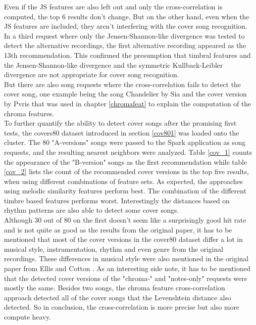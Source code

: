 \noindent Even if the JS features are also left out and only the cross-correlation is computed, the top 6 results don't change. But on the other hand, even when the JS features are included, they aren't interfering with the cover song recognition. In a third request where only the Jensen-Shannon-like divergence was tested to detect the alternative recordings, the first alternative recording appeared as the 13th recommendation. This confirmed the presumption that timbral features and the Jensen-Shannon-like divergence and the symmetric Kullback-Leibler divergence are not appropriate for cover song recognition.\\
\noindent But there are also song requests where the cross-correlation fails to detect the cover song, one example being the song Chandelier by Sia and the cover version by Pvris that was used in chapter \ref{chromafeat} to explain the computation of the chroma features.\\
\noindent To further quantify the ability to detect cover songs after the promising first tests, the covers80 dataset introduced in section \ref{cov801} was loaded onto the cluster. The 80 "A-versions" songs were passed to the Spark application as song requests, and the resulting nearest neighbors were analyzed. Table \ref{cov_1} counts the appearance of the "B-version" songs as the first recommendation while table \ref{cov_2} lists the count of the recommended cover versions in the top five results, when using different combinations of feature sets. As expected, the approaches using melodic similarity features perform best. The combination of the different timbre based features performs worst. Interestingly the distances based on rhythm patterns are also able to detect some cover songs.\\
\noindent Although 30 out of 80 on the first doesn't seem like a surprisingly good hit rate and is not quite as good as the results from the original paper, it has to be mentioned that most of the cover versions in the cover80 dataset differ a lot in musical style, instrumentation, rhythm and even genre from the original recordings. These differences in musical style were also mentioned in the original paper from Ellis and Cotton \cite[p. 3]{cover802}.
\noindent As an interesting side note, it has to be mentioned that the detected cover versions of the "chroma-" and "notes-only" requests were mostly the same. Besides two songs, the chroma feature cross-correlation approach detected all of the cover songs that the Levenshtein distance also detected. So in conclusion, the cross-correlation is more precise but also more compute heavy.

